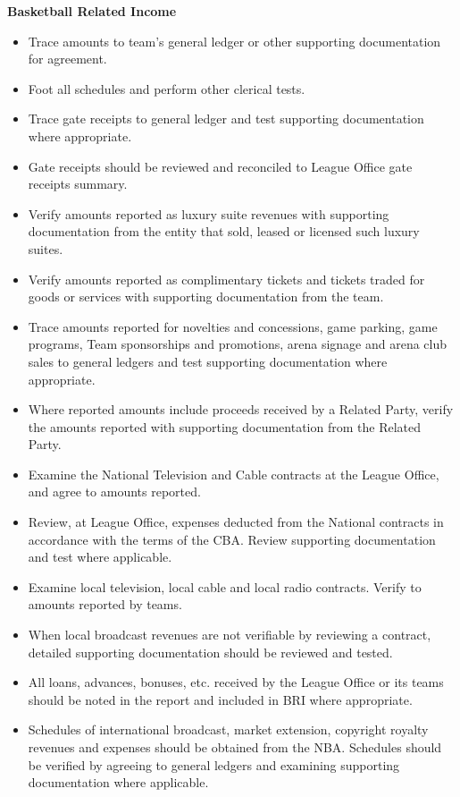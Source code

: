 \documentclass[
]{book}
\providecommand{\tightlist}{%
  \setlength{\itemsep}{0pt}\setlength{\parskip}{0pt}}
\begin{document}
\textbf{Basketball Related Income}

\begin{itemize}
\tightlist
\item
  Trace amounts to team's general ledger or other supporting documentation for agreement.
\item
  Foot all schedules and perform other clerical tests.
\item
  Trace gate receipts to general ledger and test supporting documentation where appropriate.
\item
  Gate receipts should be reviewed and reconciled to League Office gate receipts summary.
\item
  Verify amounts reported as luxury suite revenues with supporting documentation from the entity that sold, leased or licensed such luxury suites.
\item
  Verify amounts reported as complimentary tickets and tickets traded for goods or services with supporting documentation from the team.
\item
  Trace amounts reported for novelties and concessions, game parking, game programs, Team sponsorships and promotions, arena signage and arena club sales to general ledgers and test supporting documentation where appropriate.
\item
  Where reported amounts include proceeds received by a Related Party, verify the amounts reported with supporting documentation from the Related Party.
\item
  Examine the National Television and Cable contracts at the League Office, and agree to amounts reported.
\item
  Review, at League Office, expenses deducted from the National contracts in accordance with the terms of the CBA. Review supporting documentation and test where applicable.
\item
  Examine local television, local cable and local radio contracts. Verify to amounts reported by teams.
\item
  When local broadcast revenues are not verifiable by reviewing a contract, detailed supporting documentation should be reviewed and tested.
\item
  All loans, advances, bonuses, etc. received by the League Office or its teams should be noted in the report and included in BRI where appropriate.
\item
  Schedules of international broadcast, market extension, copyright royalty revenues and expenses should be obtained from the NBA. Schedules should be verified by agreeing to general ledgers and examining supporting documentation where applicable.

\end{itemize}
\end{document}
